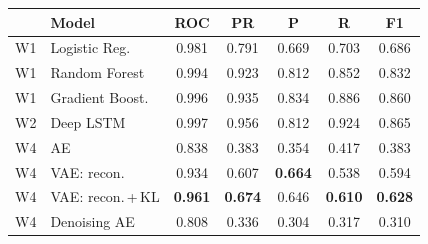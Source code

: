 \begin{tabular}{llccccc}
\hline
& \textbf{Model} & \textbf{ROC} & \textbf{PR} & \textbf{P} & \textbf{R} & \textbf{F1} \\ \hline
W1 & Logistic Reg. & 0.981 & 0.791 & 0.669 & 0.703 & 0.686 \\
W1 & Random Forest & 0.994 & 0.923 & 0.812 & 0.852 & 0.832 \\
W1 & Gradient Boost. & 0.996 & 0.935 & 0.834 & 0.886 & 0.860 \\
W2 & Deep LSTM & 0.997 & 0.956 & 0.812 & 0.924 & 0.865 \\
\hline
W4 & AE & 0.838 & 0.383 & 0.354 & 0.417 & 0.383 \\
W4 & VAE: recon. & 0.934 & 0.607 & \textbf{0.664} & 0.538 & 0.594 \\
W4 & VAE: recon.\,+\,KL & \textbf{0.961} & \textbf{0.674} & 0.646 & \textbf{0.610} & \textbf{0.628} \\
W4 & Denoising AE & 0.808 & 0.336 & 0.304 & 0.317 & 0.310 \\
\hline
\end{tabular}
